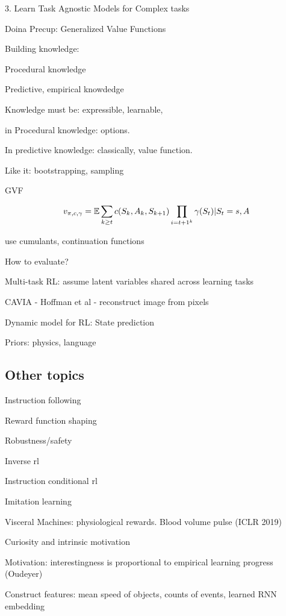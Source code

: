 \documentclass[english]{article}
\begin{document}
3. Learn Task Agnostic Models for Complex tasks

\item Doina Precup: Generalized Value Functions

Building knowledge:

Procedural knowledge

Predictive, empirical knowdedge

Knowledge must be: expressible, learnable, 

in Procedural knowledge: options.

In predictive knowledge: classically, value function.

Like it: bootstrapping, sampling

GVF

$$
v_{\pi,c,\gamma}
= 
\mathbb{E}
\sum_{k\ge t}
c(S_k,A_k,S_{k+1})
\prod_{i=t+1^k}
\gamma(S_{t})|
S_t=s,
A
$$

use cumulants, continuation functions

How to evaluate?

\item Multi-task RL: assume latent variables shared across learning tasks

CAVIA - Hoffman et al - reconstruct image from pixels

\item 

Dynamic model for RL: State prediction

Priors: physics, language

\eenum

\subsection{Other topics}
%
\benum
\item Instruction following
\item Reward function shaping
\item Robustness/safety
\item  Inverse rl
\item Instruction conditional rl
\item  Imitation learning
\item Visceral Machines: physiological rewards. Blood volume pulse (ICLR 2019)
\item Curiosity and intrinsic motivation

Motivation: interestingness is proportional to empirical learning progress (Oudeyer)

Construct features: mean speed of objects, counts of events, learned RNN embedding
\end{document}
